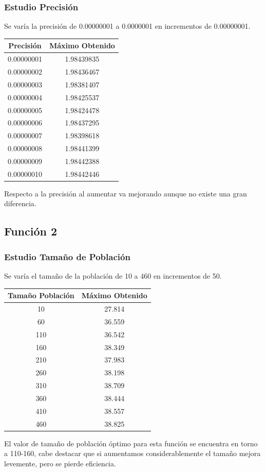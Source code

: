 \documentclass[12pt]{article}
\begin{document}
\subsubsection*{Estudio Precisión}
	Se varía la precisión de 0.00000001 a 0.0000001 en incrementos de 0.00000001.
\begin{table}[H]
\begin{center}
\begin{tabular}{|cc|} \hline
Precisión & Máximo Obtenido \\  \hline
0.00000001 & 1.98439835 \\ 
0.00000002 & 1.98436467 \\ 
0.00000003 & 1.98381407 \\
0.00000004 & 1.98425537 \\
0.00000005 & 1.98424478 \\
0.00000006 & 1.98437295 \\
0.00000007 & 1.98398618 \\
0.00000008 & 1.98441399 \\ 
0.00000009 & 1.98442388 \\
0.00000010 & 1.98442446 \\  \hline
\end{tabular}
\end{center}
\end{table}
	Respecto a la precisión al aumentar va mejorando aunque no existe una gran diferencia.

\subsection{Función 2}
\subsubsection*{Estudio Tamaño de Población}
	Se varía el tamaño de la población de 10 a 460 en incrementos de 50.
\begin{table}[H]
\begin{center}
\begin{tabular}{|cc|} \hline
Tamaño Población & Máximo Obtenido \\  \hline
10  & 27.814 \\ 
60  & 36.559 \\ 
110 & 36.542 \\
160 & 38.349 \\
210 & 37.983 \\
260 & 38.198 \\
310 & 38.709 \\
360 & 38.444 \\ 
410 & 38.557 \\
460 & 38.825 \\  \hline
\end{tabular}
\end{center}
\end{table}
	El valor de tamaño de población óptimo para esta función se encuentra en torno a 110-160, cabe destacar que si aumentamos considerablemente el tamaño mejora levemente, pero se pierde eficiencia.
\end{document}
